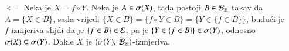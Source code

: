 \begin{rj}[\ref{zad:3.20}]
\begin{itemize}
        \item[$\impliedby$]
        Neka je $X = f \circ Y$. Neka je $A \in \sigma({X})$, tada postoji $B \in \mathcal{B}_{\mathbb{R}}$ takav da $A = \{ X \in B\}$, sada vrijedi $\{  X \in B \} = \{ f \circ Y \in B \} = \{ Y \in \{ f \in B \} \}$, budu\' ci je $f$ izmjeriva slijdi da je $\{f \in B\} \in \mathcal{E}$, pa je $\{Y \in \{ f \in B \}\} \in \sigma({Y})$, odnosno $\sigma({X}) \subseteq \sigma({Y})$.
        Dakle $X$ je $({\sigma({Y})}, \: {\mathcal{B}_{\mathbb{R}}})$-izmjeriva.
    \end{itemize}
\end{rj}